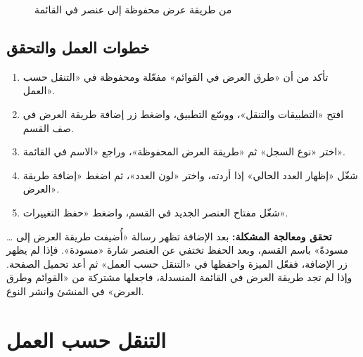 \begin{figure}[H]
\centering
{}
\rclegend
\caption{من طريقة عرض محفوظة إلى عنصر في القائمة}
\label{fig:builder-navigation-views-flow}
\end{figure}

\subsection{خطوات العمل والتحقق}
\begin{enumerate}
\item تأكد من أن «طرق العرض في القوائم» مفعّلة ومحفوظة في «التنقل حسب العمل».
\item افتح «التطبيقات والتنقل»، ووسّع التطبيق، واضغط زر إضافة طريقة العرض في صف القسم.
\item اختر «نوع السجل» ثم «طريقة العرض المحفوظة»، وراجع «الاسم في القائمة».
\item شغّل «إظهار العدد الحالي» إذا أردته، واختر «لون العدد»، ثم اضغط «إضافة طريقة العرض».
\item شغّل مفتاح العنصر الجديد في القسم، واضغط «حفظ التغييرات».
\end{enumerate}

\textbf{تحقق ومعالجة المشكلة:} بعد الإضافة تظهر رسالة «أُضيفت طريقة العرض إلى … مسودةً» باسم القسم، وبعد الحفظ تختفي عن العنصر شارة «مسودة». فإذا لم يظهر زر الإضافة، ففعّل الميزة واحفظها في «التنقل حسب العمل» ثم أعد تحميل الصفحة. وإذا لم تجد طريقة العرض في القائمة المنسدلة، فاجعلها مشتركة من «القوائم وطرق العرض» في المنشئ وانشر النوع.

\clearpage
\section{التنقل حسب العمل}
\label{sec:builder-feature-work-navigation}

